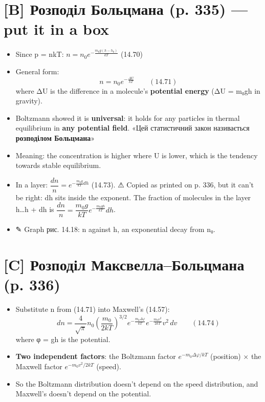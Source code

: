 \documentclass[11pt,a4paper,oneside]{book}
\newcommand{\pen}{{\sffamily\color{accent}✎}}
\newcommand{\warn}{{\sffamily\color{warncol}⚠}}
\begin{document}
\section*{[B] Розподіл Больцмана (p. 335) — put it in a box}
\begin{itemize}
\item Since p = nkT: $n = n_0e^{-\frac{m_0g(h-h_0)}{kT}}$ (14.70)
\item General form:
\[n = n_0e^{-\frac{\Delta U}{kT}}\qquad(14.71)\]
where ΔU is the difference in a molecule's \textbf{potential energy} (ΔU = m₀gh in gravity).
\item Boltzmann showed it is \textbf{universal}: it holds for any particles in thermal equilibrium in \textbf{any potential field}. «Цей статистичний закон називається \textbf{розподілом Больцмана}»
\item Meaning: the concentration is higher where U is lower, which is the tendency towards stable equilibrium.
\item In a layer: $\dfrac{dn}{n} = e^{-\frac{m_0g}{kT}dh}$ (14.73). \warn{} Copied as printed on p. 336, but it can't be right: dh sits inside the exponent. The fraction of molecules in the layer h…h + dh is $\dfrac{dn}{n} = \dfrac{m_0g}{kT}e^{-\frac{m_0gh}{kT}}dh$.
\item \pen{} Graph рис. 14.18: n against h, an exponential decay from n₀.
\end{itemize}

\section*{[C] Розподіл Максвелла–Больцмана (p. 336)}
\begin{itemize}
\item Substitute n from (14.71) into Maxwell's (14.57):
\[dn = \frac4{\sqrt\pi}n_0\left(\frac{m_0}{2kT}\right)^{3/2}e^{-\frac{m_0\Delta\varphi}{kT}}e^{-\frac{m_0v^2}{2kT}}v^2\,dv\qquad(14.74)\]
where φ = gh is the potential.
\item \textbf{Two independent factors}: the Boltzmann factor $e^{-m_0\Delta\varphi/kT}$ (position) × the Maxwell factor $e^{-m_0v^2/2kT}$ (speed).
\item So the Boltzmann distribution doesn't depend on the speed distribution, and Maxwell's doesn't depend on the potential.
\end{itemize}
\end{document}

